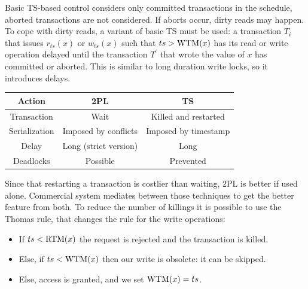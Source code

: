\documentclass[12pt, a4paper]{report}
\newtheorem[style=M,bodystyle=\normalfont]{theorem}{Theorem}
\newtheorem[style=M,bodystyle=\normalfont]{corollary}{Corollary}
\newtheorem[style=M,bodystyle=\normalfont]{lemma}{Lemma}
\newtheorem[style=M,bodystyle=\normalfont]{definition}{Definition}
\begin{document}
    Basic TS-based control considers only committed transactions in the schedule, aborted transactions are not considered. If aborts occur, dirty reads may happen. To cope with dirty 
    reads, a variant of basic TS must be used: a transaction $T_i$ that issues $r_{ts}(x)$ or $w_{ts}(x)$ such that $ts>\textnormal{WTM}(x)$ has its read or write operation delayed until the
    transaction $T^{'}$ that wrote the value of $x$ has committed or aborted. This is similar to long duration write locks, so it introduces delays. 
    \begin{table}[H]
        \centering
        \begin{tabular}{c|cc}
        \textbf{Action} & \textbf{2PL}          & \textbf{TS}          \\ \hline
        Transaction     & Wait                  & Killed and restarted \\
        Serialization   & Imposed by conflicts  & Imposed by timestamp \\
        Delay           & Long (strict version) & Long                 \\
        Deadlocks       & Possible              & Prevented           
        \end{tabular}
    \end{table}
    Since that restarting a transaction is costlier than waiting, 2PL is better if used alone. Commercial system mediates between those techniques to get the better feature from both. 
    To reduce the number of killings it is possible to use the Thomas rule, that changes the rule for the write operations: 
    \begin{itemize}
        \item If $ts<\textnormal{RTM}(x)$ the request is rejected and the transaction is killed. 
        \item Else, if $ts<\textnormal{WTM}(x)$ then our write is obsolete: it can be skipped. 
        \item Else, access is granted, and we set $\textnormal{WTM}(x)=ts$. 
    \end{itemize}
\end{document}
